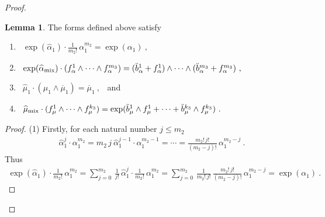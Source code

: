 \documentclass[a4paper, reqno, 11pt]{amsart}
\numberwithin{equation}{section}
\theoremstyle{definition}
\newtheorem{lemma}[equation]{Lemma}
\theoremstyle{remark}
\begin{document}
\begin{proof}
\begin{lemma} \label{lem:formsdefined}
The forms defined above satisfy
    \begin{enumerate}
        \item \ $\displaystyle \exp(\widehat \alpha_1) \cdot \frac{1}{m_2!}\,\alpha_1^{m_2} = \exp(\alpha_1) \ , $ \\
        \item \ $\exp(\widehat \alpha_{\rm mix}) \cdot ( f_\alpha^1 \wedge \cdots \wedge f_\alpha^{m_3}) = (\ddot b_\alpha^1 + f_\alpha^1) \wedge \cdots \wedge (\ddot b_\alpha^{m_3} + f_\alpha^{m_3}) \ , $ \\[-3mm]
        \item \ $\widehat \mu_1 \cdot(\mu_1 \wedge \overline{\mu}_1) = \overline{\mu}_1 \ , $ \ and \\[-3mm]
        \item \ $\widehat\mu_{\rm mix} \cdot (f_\mu^1 \wedge \cdots \wedge f_\mu^{k_3}) = \exp(\ddot{b}_\mu^1 \wedge f_\mu^1 + \cdots +\ddot{b}_\mu^{k_3} \wedge f_\mu^{k_3}) \ .$
    \end{enumerate}
\end{lemma}

\begin{proof}
    (1) Firstly, for each natural number $j\leqslant m_2$
    \begin{align}
        \widehat \alpha_1^j \cdot \alpha_1^{m_2} = m_2\, j\ \widehat\alpha_1^{j-1} \cdot \alpha_1^{m_2-1} = \cdots = \frac{m_2!\, j!}{(m_2-j)!}\,\alpha_1^{m_2-j} \ .
    \end{align}
    Thus
    \begin{equation}
    \begin{aligned}
        \exp(\widehat \alpha_1) \cdot \frac{1}{m_2!}\, \alpha_1^{m_2} = \sum_{j=0}^{m_2}\,\frac1{j!}\,\widehat\alpha_1^j  \cdot \frac{1}{m_2!}\, \alpha_1^{m_2}=\sum_{j=0}^{m_2}\, \frac{1}{m_2!\,j!}\, \frac{m_2!\, j!}{(m_2-j)!}\, \alpha_1^{m_2-j} = \exp( \alpha_1)\ .
    \end{aligned}
    \end{equation}
    

\end{proof}
\end{proof}
\end{document}
